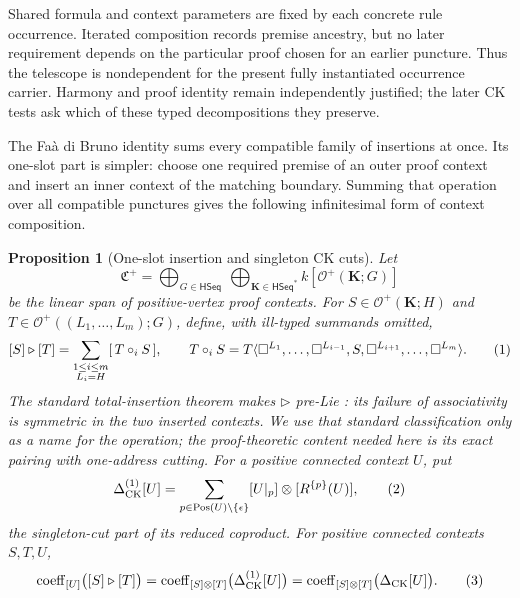 \documentclass[10pt,a4paper]{article}
\theoremstyle{plain}
\newtheorem{proposition}[theorem]{Proposition}
\theoremstyle{definition}
\theoremstyle{remark}
\newcommand{\DeltaCK}{\Delta_{\mathrm{CK}}}
\newcommand{\HSeq}{\mathsf{HSeq}}
\newcommand{\eqtag}{\refstepcounter{equation}\tag{\theequation}}
\begin{document}
Shared formula and context parameters are fixed by each concrete rule
occurrence.  Iterated composition records premise ancestry, but no later
requirement depends on the particular proof chosen for an earlier
puncture.  Thus the telescope is nondependent for the present fully
instantiated occurrence carrier.  Harmony and proof identity remain
independently justified; the later CK tests ask which of these typed
decompositions they preserve.

The Fa\`a di Bruno identity sums every compatible family of insertions at
once.  Its one-slot part is simpler: choose one required premise of an
outer proof context and insert an inner context of the matching boundary.
Summing that operation over all compatible punctures gives the following
infinitesimal form of context composition.

\begin{proposition}[One-slot insertion and singleton CK cuts]
\label{prop:prelie-context-insertion}
Let
\[
 \mathfrak C^+
   =\bigoplus_{G\in\HSeq}\ 
      \bigoplus_{\mathbf K\in\HSeq^\ast}
        k[\mathcal O^+(\mathbf K;G)]
\]
be the linear span of positive-vertex proof contexts.  For
\(
S\in\mathcal O^+(\mathbf K;H)
\)
and
\(
T\in\mathcal O^+((L_1,\ldots,L_m);G)
\),
define, with ill-typed summands omitted,
\[
 [S]\mathbin{\triangleright}[T]
   =
 \sum_{\substack{1\le i\le m\\L_i=H}}
   [\,T\circ_i S\,],
\qquad
 T\circ_iS
   =
 T\langle
   \Box^{L_1},\ldots,\Box^{L_{i-1}},
   S,\Box^{L_{i+1}},\ldots,\Box^{L_m}
 \rangle .
\eqtag\label{eq:prelie-context-insertion}
\]
The standard total-insertion theorem makes
\(\triangleright\) pre-Lie
\cite{chapoton2002,chapotonlivernet2001}: its failure of associativity is
symmetric in the two inserted contexts.  We use that standard
classification only as a name for the operation; the proof-theoretic
content needed here is its exact pairing with one-address cutting.
For a positive connected context \(U\), put
\[
 \Delta_{\mathrm{CK}}^{(1)}[U]
   =
 \sum_{p\in\operatorname{Pos}(U)\setminus\{\epsilon\}}
   [U|_p]\otimes[R^{\{p\}}(U)],
\eqtag\label{eq:singleton-cut-coproduct}
\]
the singleton-cut part of its reduced coproduct.  For positive connected
contexts \(S,T,U\),
\[
 \operatorname{coeff}_{[U]}
       \bigl([S]\triangleright[T]\bigr)
 =
 \operatorname{coeff}_{[S]\otimes[T]}
       \bigl(\Delta_{\mathrm{CK}}^{(1)}[U]\bigr)
 =
 \operatorname{coeff}_{[S]\otimes[T]}
       \bigl(\DeltaCK[U]\bigr).
\eqtag\label{eq:singleton-cut-pairing}
\]
\end{proposition}
\end{document}
